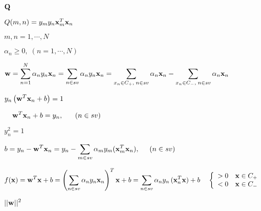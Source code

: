 \documentclass{article}
\def\lthtmlcheckvsize{\ifdim\ht\sizebox<\vsize 
  \ifdim\wd\sizebox<\hsize\expandafter\hfill\fi \expandafter\vfill
  \else\expandafter\vss\fi}%
\begin{document}
{\newpage\clearpage
{}%
$ {\bf Q}$%
\lthtmlindisplaymathZ
\lthtmlcheckvsize\clearpage}

{\newpage\clearpage
{}%
$ Q(m,n)=y_my_n{\bf x}_m^T{\bf x}_n$%
\lthtmlindisplaymathZ
\lthtmlcheckvsize\clearpage}

{\newpage\clearpage
{}%
$ m,n=1,\cdots,N$%
\lthtmlindisplaymathZ
\lthtmlcheckvsize\clearpage}

{\newpage\clearpage
{}%
$ \alpha_n\ge 0,\;(n=1,\cdots,N)$%
\lthtmlindisplaymathZ
\lthtmlcheckvsize\clearpage}

{\newpage\clearpage
{}%
$\displaystyle {\bf w}=\sum_{n=1}^N \alpha_n y_n {\bf x}_n
=\sum_{n\in sv} \alpha_ny_n{\bf x}_n
=\sum_{x_n\in C_+,\;n\in sv} \alpha_n{\bf x}_n
-\sum_{x_n\in C_-,\;n\in sv} \alpha_n{\bf x}_n$%
\lthtmlindisplaymathZ
\lthtmlcheckvsize\clearpage}

{\newpage\clearpage
{}%
$\displaystyle y_n \left( {\bf w}^T {\bf x}_n+b\right) = 1\;\;\;\;\;$%
\lthtmlindisplaymathZ
\lthtmlcheckvsize\clearpage}

{\newpage\clearpage
{}%
$\displaystyle \;\;\;\;
{\bf w}^T {\bf x}_n+b = y_n,\;\;\;\;\;\;(n\in sv)$%
\lthtmlindisplaymathZ
\lthtmlcheckvsize\clearpage}

{\newpage\clearpage
{}%
$ y_n^2=1$%
\lthtmlindisplaymathZ
\lthtmlcheckvsize\clearpage}

{\newpage\clearpage
{}%
$\displaystyle b = y_n-{\bf w}^T {\bf x}_n
=y_n-\sum_{m \in sv} \alpha_m y_m( {\bf x}_m^T{\bf x}_n),\;\;\;\;\;(n\in sv)$%
\lthtmlindisplaymathZ
\lthtmlcheckvsize\clearpage}

{\newpage\clearpage
{}%
$\displaystyle f({\bf x})={\bf w}^T{\bf x}+b
=\left(\sum_{n\in sv}\alpha_ny_n{\bf x}_n\right)^T{\bf x}+b
=\sum_{n\in sv}\alpha_ny_n\,({\bf x}^T_n{\bf x})+b\;\;\;\;
\left\{\begin{array}{ll}>0 & {\bf x}\in C_+\\<0 & {\bf x}\in C_-
\end{array}\right.$%
\lthtmlindisplaymathZ
\lthtmlcheckvsize\clearpage}

{\newpage\clearpage
{}%
$\displaystyle ||{\bf w}||^2$%
\lthtmlindisplaymathZ
\lthtmlcheckvsize\clearpage}
\end{document}
